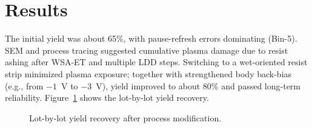 \section{Results}

The initial yield was about 65\%, with pause-refresh errors dominating (Bin-5).
SEM and process tracing suggested cumulative plasma damage due to resist ashing after WSA-ET and multiple LDD steps.
Switching to a wet-oriented resist strip minimized plasma exposure; together with strengthened body back-bias (e.g., from $-1$~V to $-3$~V), yield improved to about 80\% and passed long-term reliability.
Figure~\ref{fig:yield} shows the lot-by-lot yield recovery.

\begin{figure}[!t]
  \centering
  \yieldtable
  \caption{Lot-by-lot yield recovery after process modification.}
  \label{fig:yield}
\end{figure}

